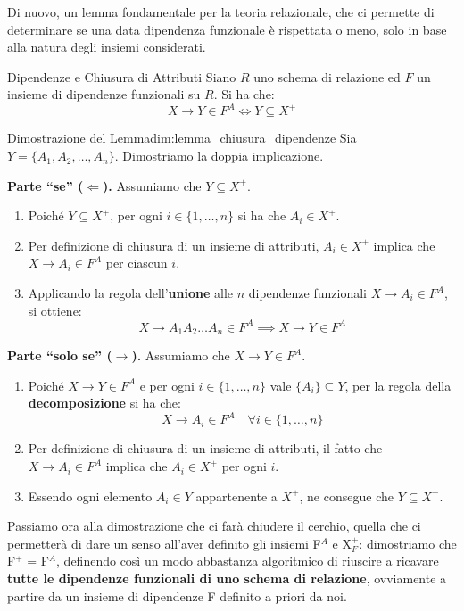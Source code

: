 \documentclass[12pt]{report}
\newcommand{\ra}{
	\rightarrow
}
\begin{document}
	Di nuovo, un lemma fondamentale per la teoria relazionale, che ci permette di determinare se una data dipendenza funzionale è rispettata o meno, solo in base alla natura degli insiemi considerati.
	\begin{lemma}{Dipendenze e Chiusura di Attributi}{}
		\label{lem:lemma_chiusura_dipendenze}
		Siano $R$ uno schema di relazione ed $F$ un insieme di dipendenze funzionali su $R$. Si ha che:
		\[
		X \to Y \in F^A \iff Y \subseteq X^+
		\]
	\end{lemma}
	
	\begin{dimostrazione}{Dimostrazione del Lemma}{dim:lemma_chiusura_dipendenze}
		Sia $Y = \{A_1, A_2, \dots, A_n\}$. Dimostriamo la doppia implicazione.
		
		\textbf{Parte ``se'' ($\Leftarrow$).}
		Assumiamo che $Y \subseteq X^+$.
		\begin{enumerate}
			\item Poiché $Y \subseteq X^+$, per ogni $i \in \{1, \dots, n\}$ si ha che $A_i \in X^+$.
			\item Per definizione di chiusura di un insieme di attributi, $A_i \in X^+$ implica che $X \to A_i \in F^A$ per ciascun $i$.
			\item Applicando la regola dell'\textbf{unione} alle $n$ dipendenze funzionali $X \to A_i \in F^A$, si ottiene:
			\[
			X \to A_1 A_2 \dots A_n \in F^A \implies X \to Y \in F^A
			\]
		\end{enumerate}
		
		\textbf{Parte ``solo se'' ($\ra$).}
		Assumiamo che $X \to Y \in F^A$.
		\begin{enumerate}
			\item Poiché $X \to Y \in F^A$ e per ogni $i \in \{1, \dots, n\}$ vale $\{A_i\} \subseteq Y$, per la regola della \textbf{decomposizione} si ha che:
			\[
			X \to A_i \in F^A \quad \forall i \in \{1, \dots, n\}
			\]
			\item Per definizione di chiusura di un insieme di attributi, il fatto che $X \to A_i \in F^A$ implica che $A_i \in X^+$ per ogni $i$.
			\item Essendo ogni elemento $A_i \in Y$ appartenente a $X^+$, ne consegue che $Y \subseteq X^+$.
		\end{enumerate}
	\end{dimostrazione}
	
	Passiamo ora alla dimostrazione che ci farà chiudere il cerchio, quella che ci permetterà di dare un senso all'aver definito gli insiemi F$^A$ e X$^+_F$: dimostriamo che F$^+$ = F$^A$, definendo così un modo abbastanza algoritmico di riuscire a ricavare \textbf{tutte le dipendenze funzionali di uno schema di relazione}, ovviamente a partire da un insieme di dipendenze F definito a priori da noi.
	
\end{document}
